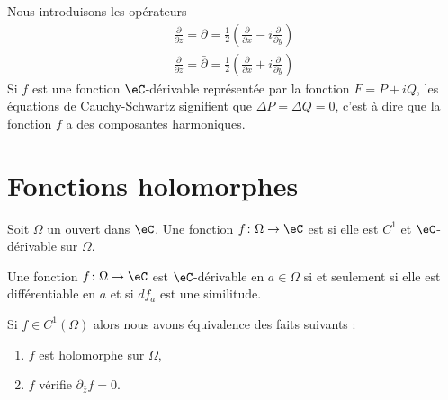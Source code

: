 Nous introduisons les opérateurs
\begin{subequations}
    \begin{align}
        \frac{ \partial  }{ \partial z }=\partial=\frac{ 1 }{2}\left( \frac{ \partial  }{ \partial x }-i\frac{ \partial  }{ \partial y } \right)\\
        \frac{ \partial  }{ \partial \bar z }=\bar\partial=\frac{ 1 }{2}\left( \frac{ \partial  }{ \partial x }+i\frac{ \partial  }{ \partial y } \right)
    \end{align}
\end{subequations}
Si \( f\) est une fonction $\eC$-dérivable représentée par la fonction \( F=P+iQ\), les équations de Cauchy-Schwartz signifient que \( \Delta P=\Delta Q=0\), c'est à dire que la fonction \( f\) a des composantes harmoniques.


\section{Fonctions holomorphes}
\label{SecoLNvnO}

\begin{definition}  \label{DefMMpjJZ}
    Soit \( \Omega\) un ouvert dans \( \eC\). Une fonction \( f\colon \Omega\to \eC\) est  si elle est \( C^1\) et \( \eC\)-dérivable sur \( \Omega\). 
\end{definition}

\begin{proposition}
    Une fonction \( f\colon \Omega\to \eC\) est $\eC$-dérivable en \( a\in\Omega\) si et seulement si elle est différentiable en \( a\) et si \( df_a\) est une similitude.
\end{proposition}

\begin{theorem} \label{ThokwIQwg}
    Si \( f\in C^1(\Omega)\) alors nous avons équivalence des faits suivants :
    \begin{enumerate}
        \item
            \( f\) est holomorphe sur \( \Omega\),
        \item
            \( f\) vérifie \( \partial_{\bar z}f=0\).
    \end{enumerate}
\end{theorem}

